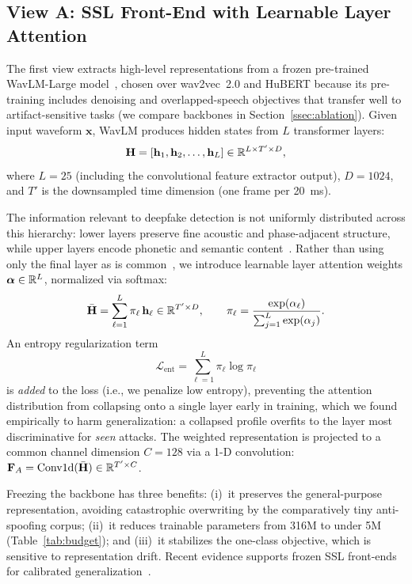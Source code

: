 \subsection{View A: SSL Front-End with Learnable Layer Attention}
\label{ssec:viewa}

The first view extracts high-level representations from a frozen pre-trained
WavLM-Large model~\cite{chen2022wavlm}, chosen over wav2vec~2.0 and HuBERT because its
pre-training includes denoising and overlapped-speech objectives that transfer well to
artifact-sensitive tasks (we compare backbones in Section~\ref{ssec:ablation}). Given
input waveform $\mathbf{x}$, WavLM produces hidden states from $L$ transformer layers:
\begin{equation}
\mathbf{H} = [\mathbf{h}_1, \mathbf{h}_2, \ldots, \mathbf{h}_L] \in \mathbb{R}^{L \times T' \times D},
\end{equation}
where $L = 25$ (including the convolutional feature extractor output), $D = 1024$, and
$T'$ is the downsampled time dimension (one frame per 20~ms).

The information relevant to deepfake detection is not uniformly distributed across this
hierarchy: lower layers preserve fine acoustic and phase-adjacent structure, while upper
layers encode phonetic and semantic content~\cite{pan2024attentive}. Rather than using
only the final layer as is common~\cite{tak2022automatic}, we introduce learnable layer
attention weights $\boldsymbol{\alpha} \in \mathbb{R}^L$, normalized via softmax:
\begin{equation}
\bar{\mathbf{H}} = \sum_{\ell=1}^L \pi_\ell \, \mathbf{h}_\ell \in \mathbb{R}^{T' \times D},
\qquad
\pi_\ell = \frac{\exp(\alpha_\ell)}{\sum_{j=1}^L \exp(\alpha_j)}.
\label{eq:layerattn}
\end{equation}
An entropy regularization term
\begin{equation}
\mathcal{L}_{\text{ent}} = \sum_{\ell=1}^{L} \pi_\ell \log \pi_\ell
\label{eq:entreg}
\end{equation}
is \emph{added} to the loss (i.e., we penalize low entropy), preventing the attention
distribution from collapsing onto a single layer early in training, which we found
empirically to harm generalization: a collapsed profile overfits to the layer most
discriminative for \emph{seen} attacks. The weighted representation is projected to a
common channel dimension $C = 128$ via a 1-D convolution:
$\mathbf{F}_A = \operatorname{Conv1d}(\bar{\mathbf{H}}) \in \mathbb{R}^{T' \times C}$.

Freezing the backbone has three benefits: (i)~it preserves the general-purpose
representation, avoiding catastrophic overwriting by the comparatively tiny
anti-spoofing corpus; (ii)~it reduces trainable parameters from 316M to under 5M
(Table~\ref{tab:budget}); and (iii)~it stabilizes the one-class objective, which is
sensitive to representation drift. Recent evidence supports frozen SSL front-ends for
calibrated generalization~\cite{pascu2024calibrated}.

